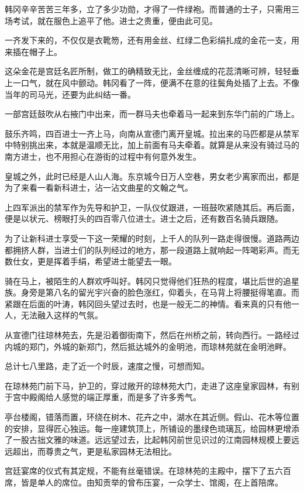 韩冈辛辛苦苦三年多，立了多少功勋，才得了一件绿袍。而普通的士子，只需用三场考试，就在服色上追平了他。进士之贵重，便由此可见。

一齐发下来的，不仅仅是衣靴笏，还有用金丝、红绿二色彩绢扎成的金花一支，用来插在帽子上。

这朵金花是宫廷名匠所制，做工的确精致无比，金丝缠成的花蕊清晰可辨，轻轻垂上一口气，就在风中颤动。韩冈看了一阵，便满不在意的往鬓角处插了上去。不像当年的司马光，还要为此纠结一番。

一部宫廷鼓吹从右掖门中出来，而一群马夫也牵着马一起来到东华门前的广场上。

鼓乐齐鸣，四百进士一齐上马，向南从宣德门离开皇城。拉出来的马匹都是从禁军中特别挑出来，本就是温顺无比，加上前面有马夫牵着。就算是从来没有骑过马的南方进士，也不用担心在游街的过程中有何意外发生。

皇城之外，此时已经是人山人海。东京城今日万人空巷，男女老少离家而出，都是为了来看一看新科进士，沾一沾文曲星的文翰之气。

上四军派出的禁军作为先导和护卫，一队仪仗跟进，一班鼓吹紧随其后。再后面，便是以状元、榜眼打头的四百零八位进士。进士之后，还有数百名骑兵跟随。

为了让新科进士享受一下这一荣耀的时刻，上千人的队列一路走得很慢。道路两边都拥挤人群，当进士们的队列经过的地方，那一段道路上就响起一阵喝彩声。而无数仕女，更是挥着手绢，希望进士能望去一眼。

骑在马上，被陌生的人群欢呼叫好。韩冈只觉得他们狂热的程度，堪比后世的追星族。身旁是第八名的留光宇兴奋的脸色涨红，仰着头，在马背上将腰挺得笔直。而紧跟在后面的叶涛，韩冈回头望过去时，也是一般无二的神情。看来真的只有他一人，无法融入这样的气氛。

从宣德门往琼林苑去，先是沿着御街南下，然后在州桥之前，转向西行。一路经过内城的郑门，外城的新郑门，然后抵达城外的金明池，而琼林苑就在金明池畔。

总计七八里路，走了近一个时辰，速度之慢，可想而知。

在琼林苑门前下马，护卫的，穿过敞开的琼林苑大门，走进了这座皇家园林，有别于宫中殿阁给人感觉的端正厚重，而是多了许多秀气。

亭台楼阁，错落而置，环绕在树木、花卉之中，湖水在其近侧。假山、花木等位置的安排，显得匠心独运。每一座建筑顶上，所铺设的墨绿色琉璃瓦，给园林更增添了一股古拙文雅的味道。远远望过去，比起韩冈前世见识过的江南园林规模上要远远超出，而尊贵之气，更是私家园林无法相比。

宫廷宴席的仪式有其定规，不能有丝毫错误。在琼林苑的主殿中，摆下了五六百席，皆是单人的席位。由知贡举的曾布压宴，一众学士、馆阁，在上首陪席。


